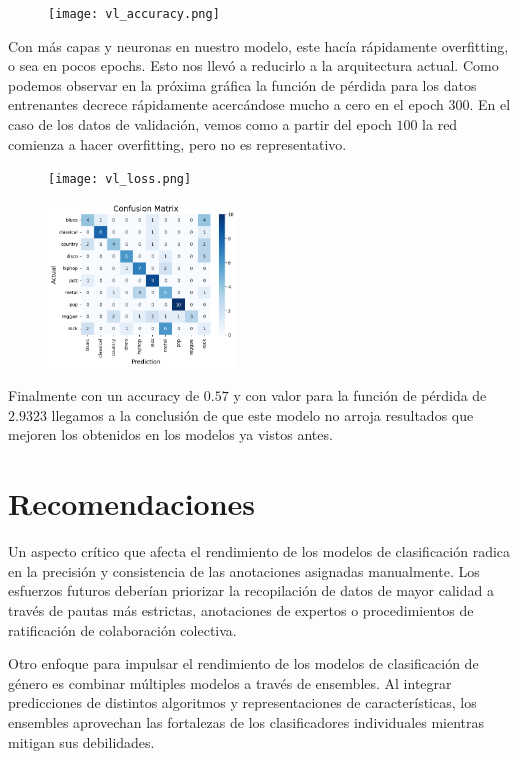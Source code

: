 \documentclass[colorinlistoftodos,twoside,twocolumn,10pt]{article} %
\begin{document}
\begin{figure}[h!]
	\texttt{[image: vl\_accuracy.png]}
\end{figure}

Con m\'as capas y neuronas en nuestro modelo, este hac\'ia r\'apidamente overfitting, o sea en pocos epochs. Esto nos llev\'o a reducirlo a la arquitectura actual. Como podemos observar en la pr\'oxima gr\'afica la funci\'on de p\'erdida para los datos entrenantes decrece r\'apidamente acerc\'andose mucho a cero en el epoch $300$. En el caso de los datos de validaci\'on, vemos como a partir del epoch $100$ la red comienza a hacer overfitting, pero no es representativo. 

\begin{figure}[h!]
	\texttt{[image: vl\_loss.png]}
\end{figure}


\begin{figure}[h!]
	\includegraphics[width=5cm]{vl_confussion_matrix.png}
\end{figure}

Finalmente con un accuracy de $0.57$ y con valor para la funci\'on de p\'erdida de  $2.9323$ llegamos a la conclusi\'on de que este modelo no arroja resultados que mejoren los obtenidos en los modelos ya vistos antes.

	\section{Recomendaciones}
  
Un aspecto crítico que afecta el rendimiento de los modelos de clasificación radica en la precisión y consistencia de las anotaciones asignadas manualmente. Los esfuerzos futuros deberían priorizar la recopilación de datos de mayor calidad a través de pautas más estrictas, anotaciones de expertos o procedimientos de ratificación de colaboración colectiva.

Otro enfoque para impulsar el rendimiento de los modelos de clasificación de género es combinar múltiples modelos a través de ensembles. Al integrar predicciones de distintos algoritmos y representaciones de características, los ensembles aprovechan las fortalezas de los clasificadores individuales mientras mitigan sus debilidades.  
\end{document}
